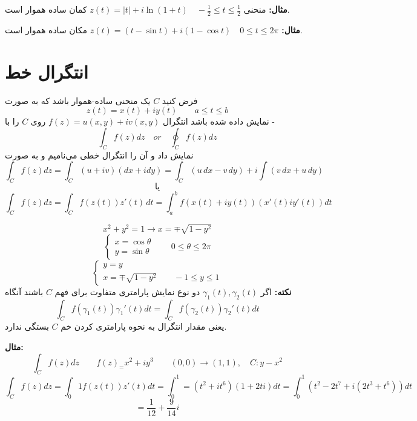 \documentclass[12pt]{report}
\begin{document}
	 \textbf{مثال:}
	 منحنی
	 $z(t) = |t| + i \ln(1 + t) \quad  -\frac{1}{2} \leq t \leq \frac{1}{2}$
	 کمان ساده هموار است.
	 
	 \textbf{مثال:}
	 $z(t) = (t - \sin t) + i(1 - \cos t)\quad 0 \leq t \leq 2\pi$
	 مکان ساده هموار است.
	 \section{انتگرال خط}
	 فرض کنید 
	 $C$
	 یک منحنی ساده-هموار باشد که به صورت
	 $$z(t) = x(t) + i y(t) \qquad a \leq t \leq b$$
	 نمایش داده شده باشد انتگرال 
	 $f(z) = u(x, y) + i v(x, y)$
	 روی 
	 $C$
	 را با -
	 $$\int_{C} f(z) dz \quad or \quad \oint_{C} f(z) dz$$
	 نمایش داد و آن را انتگرال خطی می‌نامیم و به صورت 
	 $$\int_{C} f(z) dz = \int_{C} (u + iv)(dx + idy) = \int_{C}(u \, dx -v \, dy) + i\int (v \, dx + u \, dy)
	 $$
	 $$\text{یا}$$
	 $$\int_{C} f(z) dz = \int_{C} f(z(t)) z'(t) \, dt = \int_{a}^{b} f(x(t) + i y(t))(x'(t) i y'(t)) dt$$
	 
	 $$x^2 + y^2 = 1 \rightarrow x =\mp \sqrt{1 - y^2}$$
	 \[
	 \begin{cases}
	 	x = \cos \theta \\
	 	y = \sin \theta
	 \end{cases}
 \qquad 0 \leq \theta \leq 2\pi
	 \]
	 \[
	 \begin{cases}
	 	y = y \\
	 	x = \mp \sqrt{1 - y^2} \qquad -1 \leq y \leq 1
	 \end{cases}
	 \]
	 \textbf{نکته:}
	 اگر 
	 $\gamma_1(t) , \gamma_2(t)$
	 دو نوع نمایش پارامتری متفاوت برای فهم 
	 $C$
	 باشند آنگاه
	 $$\int_{C} f(\gamma_1(t)) \gamma_1'(t) dt = \int_{C} f(\gamma_2(t)) \gamma_2'(t) dt$$ 
	 یعنی مقدار انتگرال به نحوه پارامتری کردن خم 
	 $C$
	 بستگی ندارد.
	 
	 \textbf{مثال:}
	 $$\int_{C} f(z) dz \qquad f(z)_ = x^2 + iy^3 \qquad (0,0) \rightarrow (1, 1), \quad C: y - x^2$$
	 $$\int_{C} f(z) dz = \int_{0}{1} f(z(t)) z'(t) dt = \int_{0}^{1} = (t^2 + it^6)(1 + 2ti)dt = \int_{0}^{1} (t^2 - 2t^7 + i(2t^3 + t^6))dt$$
	 $$=\frac{1}{12} + \frac{9}{14}i$$
	 
\end{document}
